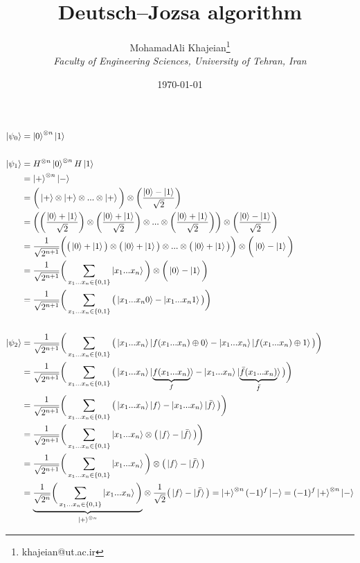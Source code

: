\documentclass{article}
\title{\textbf{Deutsch–Jozsa algorithm}}
\author{
    MohamadAli Khajeian\footnote{khajeian@ut.ac.ir} \\ 
    \small \textit{Faculty of Engineering Sciences, University of Tehran, Iran} \\ 
}
\date{\today}
\begin{document}
\maketitle
\begin{align*}
   \ket{\psi_{0}} &= \ket{0}^{\otimes n} \ket{1} \\ \\
   \ket{\psi_{1}} &= H^{\otimes n}\ket{0}^{\otimes n} H\ket{1} \\
   &= \ket{+}^{\otimes n} \ket{-} \\&= \bigg(\ket{+}\otimes\ket{+}\otimes...\otimes\ket{+}\bigg)\otimes\bigg(\frac{\ket{0}-\ket{1}}{\sqrt{2}}\bigg) \\
   &=  \bigg(\bigg(\frac{\ket{0}+\ket{1}}{\sqrt{2}}\bigg)\otimes\bigg(\frac{\ket{0}+\ket{1}}{\sqrt{2}}\bigg)\otimes...\otimes\bigg(\frac{\ket{0}+\ket{1}}{\sqrt{2}}\bigg)\bigg)\otimes\bigg(\frac{\ket{0}-\ket{1}}{\sqrt{2}}\bigg) \\
   &=  \frac{1}{\sqrt{2^{n+1}}}\bigg(\big(\ket{0}+\ket{1}\big)\otimes\big(\ket{0}+\ket{1}\big)\otimes...\otimes\big(\ket{0}+\ket{1}\big)\bigg)\otimes\bigg(\ket{0}-\ket{1}\bigg) \\
   &=  \frac{1}{\sqrt{2^{n+1}}}\bigg(\sum_{x_{1}...x_{n} \in \{0,1\}} \ket{x_{1}...x_{n}} \bigg)\otimes\bigg(\ket{0}-\ket{1}\bigg) \\
   &=  \frac{1}{\sqrt{2^{n+1}}}\bigg(\sum_{x_{1}...x_{n} \in \{0,1\}} \big( \ket{x_{1}...x_{n}0} - \ket{x_{1}...x_{n}1} \big) \bigg) \\ \\
   \ket{\psi_{2}} &= \frac{1}{\sqrt{2^{n+1}}}\bigg(\sum_{x_{1}...x_{n} \in \{0,1\}} \big( \ket{x_{1}...x_{n}}\ket{f(x_{1}...x_{n})\oplus0} - \ket{x_{1}...x_{n}}\ket{f(x_{1}...x_{n})\oplus1} \big) \bigg) \\
   &= \frac{1}{\sqrt{2^{n+1}}}\bigg(\sum_{x_{1}...x_{n} \in \{0,1\}} \big( \ket{x_{1}...x_{n}}\ket{\underset{f}{\underbrace{f(x_{1}...x_{n})}}} - \ket{x_{1}...x_{n}}\ket{\underset{\bar{f}}{\underbrace{\bar{f}(x_{1}...x_{n})}}} \big) \bigg) \\
   &= \frac{1}{\sqrt{2^{n+1}}}\bigg(\sum_{x_{1}...x_{n} \in \{0,1\}} \big( \ket{x_{1}...x_{n}}\ket{f} - \ket{x_{1}...x_{n}}\ket{\bar{f}} \big) \bigg) \\
   &= \frac{1}{\sqrt{2^{n+1}}}\bigg(\sum_{x_{1}...x_{n} \in \{0,1\}} \ket{x_{1}...x_{n}}\otimes\big(\ket{f}-\ket{\bar{f}}\big) \bigg) \\
   &= \frac{1}{\sqrt{2^{n+1}}}\bigg(\sum_{x_{1}...x_{n} \in \{0,1\}} \ket{x_{1}...x_{n}}\bigg) \otimes\big(\ket{f}-\ket{\bar{f}}\big) \\
   &= \underset{\ket{+}^{\otimes n}}{\underbrace{\frac{1}{\sqrt{2^{n}}}\bigg(\sum_{x_{1}...x_{n} \in \{0,1\}} \ket{x_{1}...x_{n}}\bigg)}} \otimes \frac{1}{\sqrt{2}} \big(\ket{f}-\ket{\bar{f}}\big) = \ket{+}^{\otimes n}(-1)^{f}\ket{-} = (-1)^{f}\ket{+}^{\otimes n}\ket{-}
\end{align*}
\end{document}
